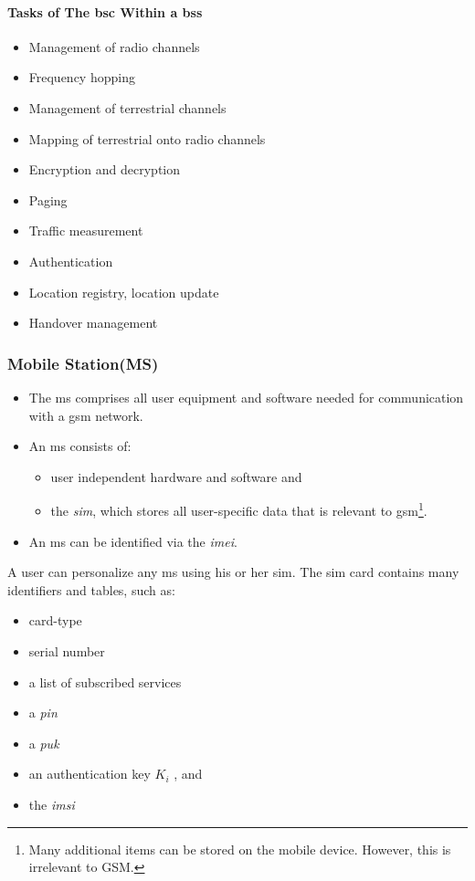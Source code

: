\paragraph*{Tasks of The \gls{bsc} Within a \gls{bss}}
\begin{multicols}{2}
	\begin{itemize}
		\item Management of radio channels
		\item Frequency hopping
		\item Management of terrestrial channels
		\item Mapping of terrestrial onto radio channels
		\item Encryption and decryption
		\item Paging
		\item Traffic measurement
		\item Authentication
		\item Location registry, location update
		\item Handover management
	\end{itemize}
\end{multicols}



\subsubsection[MS]{Mobile Station(MS)}
\begin{itemize}
	\item The \gls{ms} comprises all user equipment and software needed for communication with a \gls{gsm} network.
	\item An \gls{ms} consists of:
	\begin{itemize}
		\item user independent hardware and software and
		\item the \textit{\gls{sim}}, which stores all user-specific data that is relevant to \gls{gsm}\footnote{Many additional items can be stored on the mobile device. However, this is irrelevant to GSM.}. 
	\end{itemize}
\item An \gls{ms} can be identified via the \textit{\gls{imei}}.
\end{itemize}

 A user can personalize any \gls{ms} using his or her \gls{sim}. The \gls{sim} card contains many identifiers and tables, such as:
\begin{multicols}{2}
	\begin{itemize}
		\item card-type 
		\item serial number
		\item a list of subscribed services
		\item a \textit{\gls{pin}}
		\item a \textit{\gls{puk}}
		\item an authentication key $  K_i $ , and 
		\item the \textit{\gls{imsi}}
	\end{itemize} 
\end{multicols}


